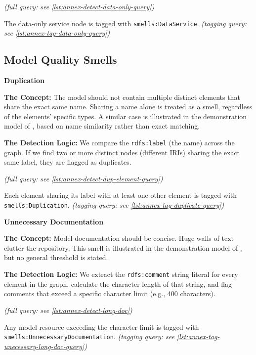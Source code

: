 \textit{(full query: see \autoref{lst:annex-detect-data-only-query})}

The data-only service node is tagged with \texttt{smells:DataService}. \textit{(tagging query: see \autoref{lst:annex-tag-data-only-query})}

\subsection{Model Quality Smells}
\label{subsec:quality-smells}

\noindent\textbf{Duplication}\par

\textbf{The Concept:} The model should not contain multiple distinct elements that share the exact same name. Sharing a name alone is treated as a smell, regardless of the elements' specific types. A similar case is illustrated in the demonstration model of \parencite{salentin2020smells}, based on name similarity rather than exact matching.

\textbf{The Detection Logic:} We compare the \texttt{rdfs:label} (the name) across the graph. If we find two or more distinct nodes (different IRIs) sharing the exact same label, they are flagged as duplicates.

\textit{(full query: see \autoref{lst:annex-detect-dup-element-query})}

Each element sharing its label with at least one other element is tagged with \texttt{smells:Duplication}. \textit{(tagging query: see \autoref{lst:annex-tag-duplicate-query})}

\noindent\textbf{Unnecessary Documentation}\par

\textbf{The Concept:} Model documentation should be concise. Huge walls of text clutter the repository. This smell is illustrated in the demonstration model of \parencite{salentin2020smells}, but no general threshold is stated.

\textbf{The Detection Logic:} We extract the \texttt{rdfs:comment} string literal for every element in the graph, calculate the character length of that string, and flag comments that exceed a specific character limit (e.g., 400 characters).

\textit{(full query: see \autoref{lst:annex-detect-long-doc})}

Any model resource exceeding the character limit is tagged with \texttt{smells:UnnecessaryDocumentation}. \textit{(tagging query: see \autoref{lst:annex-tag-unecessary-long-doc-query})}

